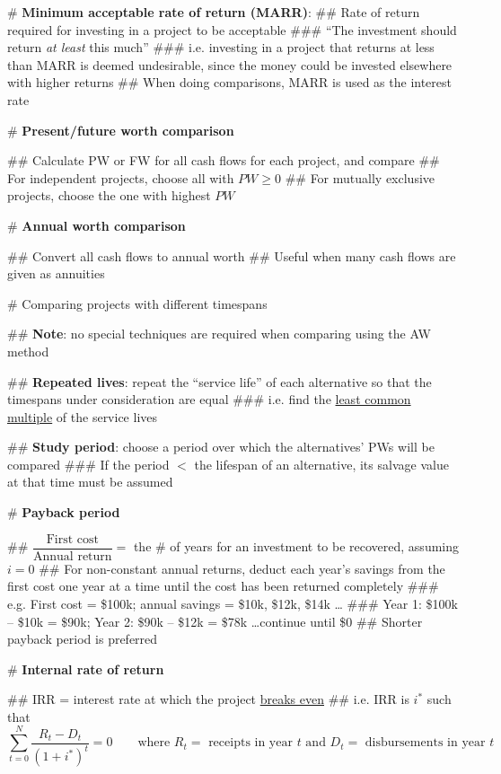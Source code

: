 \documentclass[11pt, oneside]{article}
\begin{document}
# \textbf{Minimum acceptable rate of return (MARR)}:
## Rate of return required for investing in a project to be acceptable
### ``The investment should return \emph{at least} this much''
### i.e. investing in a project that returns at less than MARR is deemed undesirable, since the money could be invested elsewhere with higher returns
## When doing comparisons, MARR is used as the interest rate

# \textbf{Present/future worth comparison}

## Calculate PW or FW for all cash flows for each project, and compare
## For independent projects, choose all with $PW \geq 0$
## For mutually exclusive projects, choose the one with highest $PW$

# \textbf{Annual worth comparison}

## Convert all cash flows to annual worth
## Useful when many cash flows are given as annuities

# Comparing projects with different timespans

## \textbf{Note}: no special techniques are required when comparing using the AW method

## \textbf{Repeated lives}: repeat the ``service life'' of each alternative so that the timespans under consideration are equal
### i.e. find the \underline{least common multiple} of the service lives

## \textbf{Study period}: choose a period over which the alternatives' PWs will be compared
### If the period $<$ the lifespan of an alternative, its salvage value at that time must be assumed

# \textbf{Payback period}

## $\dfrac{\text{First cost}}{\text{Annual return}} =$ the \# of years for an investment to be recovered, assuming $i = 0$
## For non-constant annual returns, deduct each year's savings from the first cost one year at a time until the cost has been returned completely
### e.g. First cost = \$100k; annual savings = \$10k, \$12k, \$14k \ldots
### Year 1: \$100k -- \$10k = \$90k; Year 2: \$90k -- \$12k = \$78k \ldots continue until \$0
## Shorter payback period is preferred

# \textbf{Internal rate of return}

## IRR = interest rate at which the project \underline{breaks even}
## i.e. IRR is $i^*$ such that
\[ \sum_{t=0}^{N} \dfrac{R_t - D_t}{(1 + i^*)^t} = 0 \qquad \text{where $R_t =$ receipts in year $t$ and $D_t =$ disbursements in year $t$} \]
\end{document}
